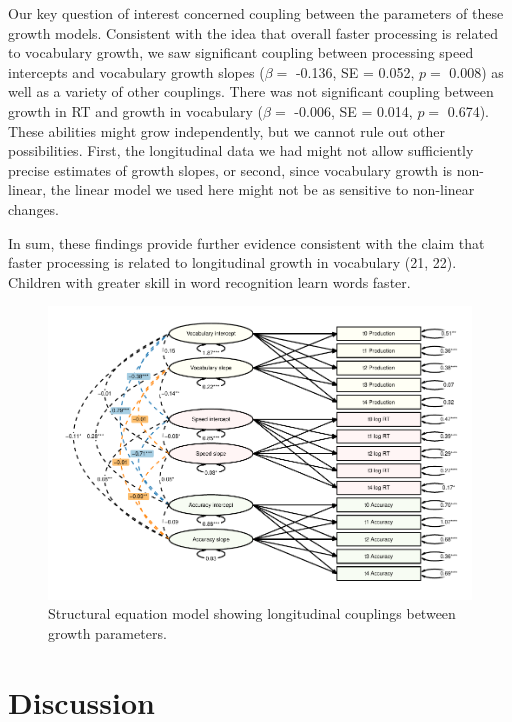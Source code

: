\documentclass[9pt,twocolumn,twoside,]{pnas-new}
\begin{document}
Our key question of interest concerned coupling between the parameters
of these growth models. Consistent with the idea that overall faster
processing is related to vocabulary growth, we saw significant coupling
between processing speed intercepts and vocabulary growth slopes
(\(\beta=\) -0.136, SE = 0.052, \(p =\) 0.008) as well as a variety of
other couplings. There was not significant coupling between growth in RT
and growth in vocabulary (\(\beta=\) -0.006, SE = 0.014, \(p =\) 0.674).
These abilities might grow independently, but we cannot rule out other
possibilities. First, the longitudinal data we had might not allow
sufficiently precise estimates of growth slopes, or second, since
vocabulary growth is non-linear, the linear model we used here might not
be as sensitive to non-linear changes.

In sum, these findings provide further evidence consistent with the
claim that faster processing is related to longitudinal growth in
vocabulary (21, 22). Children with greater skill in word recognition
learn words faster.

\begin{figure}
\includegraphics{paper_files/figure-latex/longitudinal-1} \caption{Structural equation model showing longitudinal couplings between growth parameters. }\label{fig:longitudinal}
\end{figure}

\section*{Discussion}\label{discussion}
\end{document}

